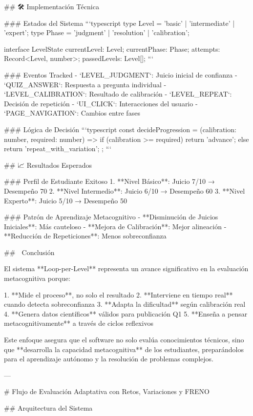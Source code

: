 ## 🛠️ Implementación Técnica

### Estados del Sistema
```typescript
type Level = 'basic' | 'intermediate' | 'expert';
type Phase = 'judgment' | 'resolution' | 'calibration';

interface LevelState {
  currentLevel: Level;
  currentPhase: Phase;
  attempts: Record<Level, number>;
  passedLevels: Level[];
}
```

### Eventos Tracked
- `LEVEL_JUDGMENT`: Juicio inicial de confianza
- `QUIZ_ANSWER`: Respuesta a pregunta individual
- `LEVEL_CALIBRATION`: Resultado de calibración
- `LEVEL_REPEAT`: Decisión de repetición
- `UI_CLICK`: Interacciones del usuario
- `PAGE_NAVIGATION`: Cambios entre fases

### Lógica de Decisión
```typescript
const decideProgression = (calibration: number, required: number) => {
  if (calibration >= required) {
    return 'advance';
  } else {
    return 'repeat_with_variation';
  }
};
```

## 📈 Resultados Esperados

### Perfil de Estudiante Exitoso
1. **Nivel Básico**: Juicio 7/10 → Desempeño 70%
2. **Nivel Intermedio**: Juicio 6/10 → Desempeño 60%
3. **Nivel Experto**: Juicio 5/10 → Desempeño 50%

### Patrón de Aprendizaje Metacognitivo
- **Disminución de Juicios Iniciales**: Más cauteloso
- **Mejora de Calibración**: Mejor alineación
- **Reducción de Repeticiones**: Menos sobreconfianza

## 🎯 Conclusión

El sistema **Loop-per-Level** representa un avance significativo en la evaluación metacognitiva porque:

1. **Mide el proceso**, no solo el resultado
2. **Interviene en tiempo real** cuando detecta sobreconfianza
3. **Adapta la dificultad** según calibración real
4. **Genera datos científicos** válidos para publicación Q1
5. **Enseña a pensar metacognitivamente** a través de ciclos reflexivos

Este enfoque asegura que el software no solo evalúa conocimientos técnicos, sino que **desarrolla la capacidad metacognitiva** de los estudiantes, preparándolos para el aprendizaje autónomo y la resolución de problemas complejos.

---

# Flujo de Evaluación Adaptativa con Retos, Variaciones y FRENO

## Arquitectura del Sistema

